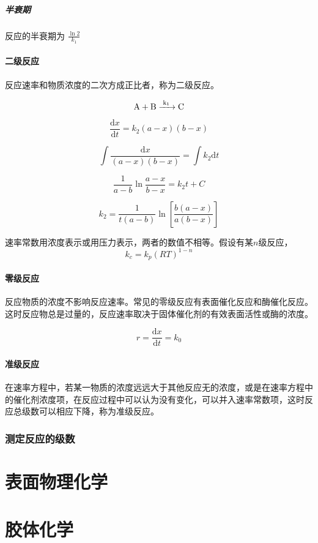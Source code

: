 \documentclass[a4paper]{ctexrep}
\renewcommand{\d}{\mathrm{d}}
\begin{document}
    \paragraph{半衰期} 反应的半衰期为 $\frac{\ln 2}{k_1}$

    \subsubsection{二级反应}

    反应速率和物质浓度的二次方成正比者，称为二级反应。

    \begin{equation*}
       \ce{A + B ->[k_1] C}
    \end{equation*}

    \begin{equation*}
      \frac{\d x}{\d t} = k_2 (a - x) (b - x)
    \end{equation*}

    \begin{equation*}
      \int \frac{\d x}{(a - x)(b - x)} = \int k_2 \d t
    \end{equation*}

    \begin{equation*}
       \frac{1}{a - b} \ln \frac{a - x}{b - x} = k_2 t + C
    \end{equation*}

    \begin{equation*}
      k_2 = \frac{1}{t(a - b)} \ln \left[ \frac{b(a - x)}{a(b - x)} \right]
    \end{equation*}

    速率常数用浓度表示或用压力表示，两者的数值不相等。假设有某$n$级反应，
    \begin{equation*}
       k_c = k_p (RT)^{1 - n}
    \end{equation*}
    \subsubsection{零级反应}
    反应物质的浓度不影响反应速率。常见的零级反应有表面催化反应和酶催化反应。这时反应物总是过量的，反应速率取决于固体催化剂的有效表面活性或酶的浓度。

    \begin{equation*}
      r = \frac{\d x}{\d t} = k_0
    \end{equation*}

    \subsubsection{准级反应}
    在速率方程中，若某一物质的浓度远远大于其他反应无的浓度，或是在速率方程中的催化剂浓度项，在反应过程中可以认为没有变化，可以并入速率常数项，这时反应总级数可以相应下降，称为准级反应。

    \subsection{测定反应的级数}
    \chapter{表面物理化学}
    \chapter{胶体化学}
\end{document}
